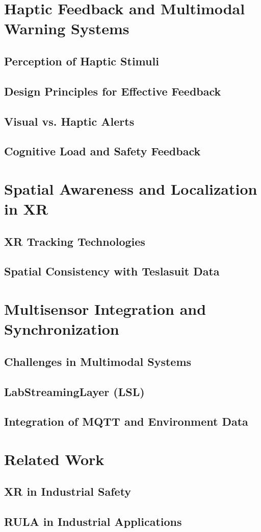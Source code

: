 \section{Haptic Feedback and Multimodal Warning Systems}
\subsection{Perception of Haptic Stimuli}

\subsection{Design Principles for Effective Feedback}

\subsection{Visual vs. Haptic Alerts}

\subsection{Cognitive Load and Safety Feedback}

\section{Spatial Awareness and Localization in XR}
\subsection{XR Tracking Technologies}

\subsection{Spatial Consistency with Teslasuit Data}

\section{Multisensor Integration and Synchronization}
\subsection{Challenges in Multimodal Systems}

\subsection{LabStreamingLayer (LSL)}

\subsection{Integration of MQTT and Environment Data}

\section{Related Work}
\subsection{XR in Industrial Safety}
\subsection{RULA in Industrial Applications}
